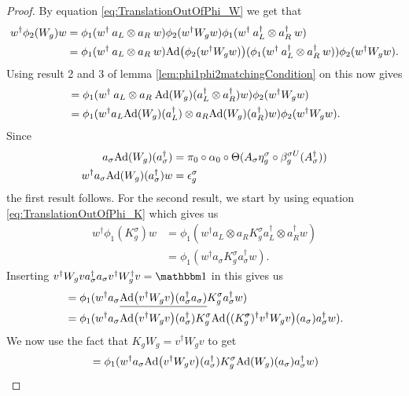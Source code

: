 \documentclass[11pt,a4paper,twoside]{article}
\numberwithin{equation}{section}
\begin{document}
	\begin{proof}
		By equation \eqref{eq:TranslationOutOfPhi_W} we get that
		\begin{align}
			w^\dagger\phi_2(W_g)w&=\phi_1(w^\dagger \: a_L\otimes a_R \: w)\phi_2(w^\dagger W_g w)\phi_1(w^\dagger \: a_L^\dagger\otimes a_R^\dagger \: w)\\
			&=\phi_1(w^\dagger \: a_L\otimes a_R \: w)\Ad{\phi_2(w^\dagger W_g w)}(\phi_1(w^\dagger \: a_L^\dagger\otimes a_R^\dagger \: w))\phi_2(w^\dagger W_g w).
		\end{align}
		Using result 2 and 3 of lemma \ref{lem:phi1phi2matchingCondition} on this now gives
		\begin{align}
			&=\phi_1(w^\dagger \: a_L\otimes a_R \:\Ad{W_g}(a_L^\dagger\otimes a_R^\dagger)w)\phi_2(w^\dagger W_g w)\\
			&=\phi_1(w^\dagger a_L\Ad{W_g}(a_L^\dagger)\otimes a_R \Ad{W_g}( a_R^\dagger)w)\phi_2(w^\dagger W_g w).
		\end{align}
		Since
		\begin{align}
			a_\sigma\Ad{W_g}(a_\sigma^\dagger)&=\pi_0\circ\alpha_0\circ\Theta(A_\sigma\eta_g^\sigma\circ\beta_g^{\sigma U}(A_\sigma^\dagger))\\
			w^\dagger a_\sigma\Ad{W_g}(a_\sigma^\dagger)w&=\epsilon_g^\sigma
		\end{align}
		the first result follows. For the second result, we start by using equation \eqref{eq:TranslationOutOfPhi_K} which gives us
		\begin{align}
			w^\dagger \phi_1(K_g^\sigma)w&=\phi_1(w^\dagger a_L\otimes a_R K_g^\sigma a_L^\dagger\otimes a_R^\dagger w)\\
			&=\phi_1(w^\dagger a_\sigma K_g^\sigma a_\sigma^\dagger w).
		\end{align}
		Inserting $v^\dagger W_g va_\sigma^\dagger a_\sigma v^\dagger W_g^\dagger v=\id$ in this gives us
		\begin{align}
			&=\phi_1(w^\dagger a_\sigma \underline{\Ad{v^\dagger W_g v}(a_\sigma^\dagger a_\sigma)} K_g^\sigma a_\sigma^\dagger w)\\
			&=\phi_1(w^\dagger a_\sigma \Ad{v^\dagger W_g v}(a_\sigma^\dagger)K_g^\sigma  \Ad{(K_g^\stkout{\sigma})^\dagger v^\dagger W_g v}(a_\sigma) a_\sigma^\dagger w).
		\end{align}
		We now use the fact that $K_g W_g=v^\dagger W_g v$ to get
		\begin{align}
			&=\phi_1(w^\dagger a_\sigma \Ad{v^\dagger W_g v}(a_\sigma^\dagger)K_g^\sigma  \Ad{W_g}(a_\sigma) a_\sigma^\dagger w)\\

\end{align}
\end{proof}
\end{document}
